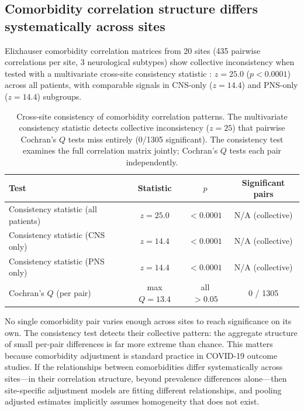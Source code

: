 \documentclass{article}
\begin{document}
\subsection{Comorbidity correlation structure differs systematically across sites}

Elixhauser comorbidity correlation matrices \cite{elixhauser1998} from 20 sites (435 pairwise correlations per site, 3 neurological subtypes) show collective inconsistency when tested with a multivariate cross-site consistency statistic \cite{robinson2017sheaf}: $z = 25.0$ ($p < 0.0001$) across all patients, with comparable signals in CNS-only ($z = 14.4$) and PNS-only ($z = 14.4$) subgroups.

\begin{table}[t]
\centering
\caption{Cross-site consistency of comorbidity correlation patterns. The multivariate consistency statistic detects collective inconsistency ($z = 25$) that pairwise Cochran's $Q$ tests miss entirely (0/1305 significant). The consistency test examines the full correlation matrix jointly; Cochran's $Q$ tests each pair independently.}
\label{tab:consistency}
\begin{tabular}{lccc}
\toprule
Test & Statistic & $p$ & Significant pairs \\
\midrule
Consistency statistic (all patients) & $z = 25.0$ & $< 0.0001$ & N/A (collective) \\
Consistency statistic (CNS only) & $z = 14.4$ & $< 0.0001$ & N/A (collective) \\
Consistency statistic (PNS only) & $z = 14.4$ & $< 0.0001$ & N/A (collective) \\
Cochran's $Q$ (per pair) & max $Q = 13.4$ & all $> 0.05$ & 0 / 1305 \\
\bottomrule
\end{tabular}
\end{table}

No single comorbidity pair varies enough across sites to reach significance on its own.
The consistency test detects their collective pattern: the aggregate structure of small per-pair differences is far more extreme than chance.
This matters because comorbidity adjustment is standard practice in COVID-19 outcome studies.
If the relationships between comorbidities differ systematically across sites---in their correlation structure, beyond prevalence differences alone---then site-specific adjustment models are fitting different relationships, and pooling adjusted estimates implicitly assumes homogeneity that does not exist.
\end{document}
